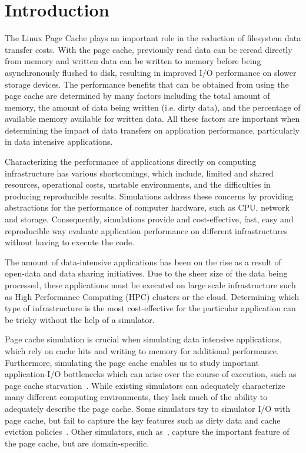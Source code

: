 \documentclass[conference]{IEEEtran}
\begin{document}
	\section{Introduction}
		
        The Linux Page Cache plays an important role in
        the reduction of filesystem data transfer costs. With the page cache, previously
        read data can be reread directly from memory and written data can be written to
        memory before being asynchronously flushed to disk, resulting in improved I/O performance
        on slower storage devices. The performance benefits that can be obtained from using the page
        cache are determined by many factors including the total amount of memory,
        the amount of data being written (i.e. dirty data), and the percentage of available memory available for
        written data. All these factors are important when determining the impact of data transfers on
        application performance, particularly in data intensive applications.

        Characterizing the performance of applications directly on computing infrastructure
        has various shortcomings, which include, limited and shared resources, operational
        costs, unstable environments, and the difficulties in producing reproducible results.
        Simulations address these concerns by providing abstractions for the performance of computer
        hardware, such as CPU, network and storage. Consequently, simulations provide and
        cost-effective, fast, easy and reproducible  way evaluate application performance
        on different infrastructures without having to execute the code.

        The amount of data-intensive applications has been on the rise as a result of
        open-data and data sharing initiatives. Due to the sheer size of the data being
        processed, these applications must be executed on large scale infrastructure
        such as High Performance Computing (HPC) clusters or the cloud. Determining
        which type of infrastructure is the most cost-effective for the particular
        application can be tricky without the help of a simulator.

        Page cache simulation is crucial when simulating data intensive applications,
        which rely on cache hits and writing to memory for additional performance.
        Furthermore, simulating the page cache enables us to study important application-I/O
        bottlenecks which can arise over the course of execution, such as page cache
        starvation~\cite{zhuang2017}.
        While existing simulators can adequately characterize many different computing environments,
        they lack much of the ability to adequately describe the page cache. Some
        simulators try to simulator I/O with page cache, but fail to capture the key features such
        as dirty data and cache eviction policies~\cite{nunez2012simcan,nunez2012icancloud}. 
        Other simulators, such as~\cite{xu2018}, capture the important feature of the
        page cache, but are domain-specific. 
\end{document}
